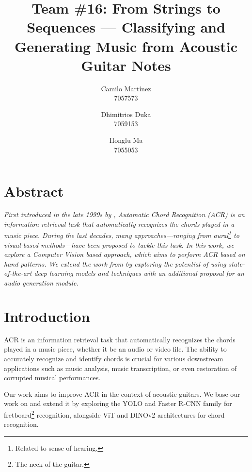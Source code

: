 \documentclass[10pt,twocolumn,letterpaper]{article}
\begin{document}
\newcommand{\dhimitrios}[1]{\textcolor{red}{Dhimitrios: #1}}

\title{Team \#16: From Strings to Sequences --- Classifying and Generating Music from Acoustic Guitar Notes}


\author{
    Camilo Martínez\\
    7057573\\
    \and
    Dhimitrios Duka\\
    7059153\\
    \and
    Honglu Ma\\
    7055053\\
}
\maketitle

\section{Abstract}
\emph{First introduced in the late 1999s by \cite{takuya1999realtime}, Automatic Chord Recognition (ACR) is an information retrieval task that automatically recognizes the chords played in a music piece. During the last decades, many approaches—ranging from aural\footnote{Related to sense of hearing.} to visual-based methods—have been proposed to tackle this task. In this work, we explore a Computer Vision based approach, which aims to perform ACR based on hand patterns. We extend the work from \cite{Kristian_Zaman_Tenoyo_Jodhinata_2024} by exploring the potential of using state-of-the-art deep learning models and techniques with an additional proposal for an audio generation module.}

\section{Introduction}
ACR is an information retrieval task that automatically recognizes the chords played in a music piece, whether it be an audio or video file. The ability to accurately recognize and identify chords is crucial for various downstream applications such as music analysis, music transcription, or even restoration of corrupted musical performances.

Our work aims to improve ACR in the context of acoustic guitars. We base our work on \cite{Kristian_Zaman_Tenoyo_Jodhinata_2024} and extend it by exploring the YOLO \cite{redmon2016you} and Faster R-CNN \cite{ren2016faster} family for fretboard\footnote{The neck of the guitar.} recognition, alongside ViT \cite{dosovitskiy2020image} and DINOv2 \cite{oquab2023dinov2} architectures for chord recognition.
\end{document}
